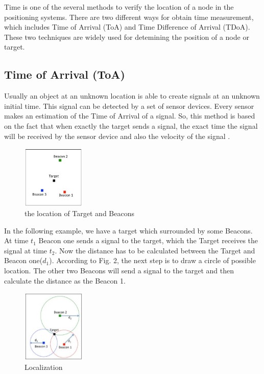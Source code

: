 Time is one of the several methods to verify the location of a node in the positioning systems. There are two different ways for obtain time measurement, which includes Time of Arrival (ToA) and Time Difference of Arrival (TDoA). These two techniques are widely used for detemining the position of a node or target.

\subsection{Time of Arrival (ToA)}

Usually an object at an unknown location is able to create signals at an unknown initial time. This signal can be detected by a set of sensor devices. Every sensor makes an estimation of the Time of Arrival of a signal. So, this method is based on the fact that when exactly the target sends a signal, the exact time the signal will be received by the sensor device and also the velocity of the signal \cite{brian17}.

\begin{figure}[htp]
    \centering
    \includegraphics[width=3cm]{1.jpg}
    \caption{the location of Target and Beacons \cite{brian17}}
    \label{fig:Target location}
\end{figure}

In the following example, we have a target which surrounded by some Beacons. At time $t_1$ Beacon one sends a signal to the target, which the Target receives the signal at time $t_2$. Now the distance has to be calculated between the Target and Beacon one($d_1$). According to Fig. 2, the next step is to draw a circle of possible location. The other two Beacons will send a signal to the target and then calculate the distance as the Beacon 1.

\begin{figure}[htp]
    \centering
    \includegraphics[width=3cm]{2.jpg}
    \caption{Localization \cite{jin18}}
    \label{fig:Localization}
\end{figure}

